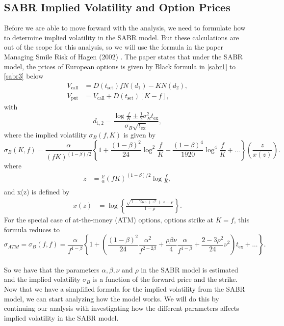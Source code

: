 \subsection{SABR Implied Volatility and Option Prices}
Before we are able to move forward with the analysis,
we need to formulate how to determine implied volatility in the SABR model. 
But these calculations are out of the scope for this analysis,
so we will use the formula in the paper Managing Smile Risk 
of Hagen (2002) \cite{Smile}. The paper states that
under the SABR model, the prices of European options 
is given by Black formula in \autoref{sabr1} to \autoref{sabr3}
below
\begin{align}
    V_{\text{call}} &= D(t_{\text{set}})fN(d_1) - KN(d_2),  \label{sabr1}\\
    V_{\text{put}} &= V_{\text{call}} + D(t_{\text{set}})[K - f], \label{sabr2}
\end{align}
with
\begin{equation}
    d_{1,2} = \frac{\log \frac{f}{K} \pm \frac{1}{2}\sigma_B^2 t_{\text{ex}}}{\sigma_B \sqrt{t_{\text{ex}}}}, \label{sabr3}
\end{equation}
where the implied volatility $\sigma_B(f, K)$ is given by
\begin{equation}
    \sigma_B(K, f) = \frac{\alpha}{(fK)^{(1-\beta)/2}} \left\{ 1 + \frac{(1-\beta)^2}{24} \log^2 \frac{f}{K} + \frac{(1-\beta)^4}{1920} \log^4 \frac{f}{K} + \ldots \right\} \left( \frac{z}{x(z)} \right).
    \label{sigma_B}
\end{equation}
where
\begin{align}
    z &= \frac{\nu}{\alpha}(fK)^{(1-\beta)/2} \log \frac{f}{K}, \\
\end{align}
and x(z) is defined by
\begin{align}
    x(z) &= \log \left\{ \frac{\sqrt{1-2\rho z + z^2} + z - \rho}{1 - \rho} \right\}.
\end{align}
For the special case of at-the-money (ATM) options, options strike at $K = f$, this formula reduces to
\begin{equation}
    \sigma_{ATM} = \sigma_B(f, f) = \frac{\alpha}{f^{1-\beta}} \left\{ 1 + \left( \frac{(1-\beta)^2}{24} \frac{\alpha^2}{f^{2-2\beta}} + \frac{\rho \beta \nu}{4} \frac{\alpha}{f^{1-\beta}} + \frac{2-3\rho^2}{24} \nu^2 \right) t_{\text{ex}} + \ldots \right\}.
    \label{sigma_ff}
\end{equation}
\\
So we have that the parameters $\alpha, \beta, \nu$ and $\rho$  in the SABR model is estimated and the implied volatility $\sigma_B$
is a function of the forward price and the strike. Now that we have a simplified formula for the implied 
volatility from the SABR model, we can start analyzing 
how the model works. We will do this by continuing our
analysis with investigating how the different parameters 
affects implied volatility in the SABR model. 

